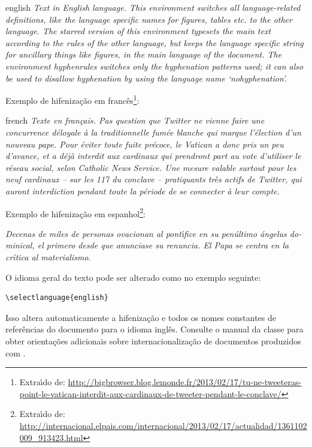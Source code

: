 \begin{otherlanguage*}{english}
	\textit{Text in English language. This environment switches all language-related
		definitions, like the language specific names for figures, tables etc. to the other
		language. The starred version of this environment typesets the main text
		according to the rules of the other language, but keeps the language specific
		string for ancillary things like figures, in the main language of the document.
		The environment hyphenrules switches only the hyphenation patterns used; it can
		also be used to disallow hyphenation by using the language name
		`nohyphenation'.}
\end{otherlanguage*}

Exemplo de hifeniza\c{c}\~ao em franc\^es\footnote{Extra\'{\i}do de:
	\url{http://bigbrowser.blog.lemonde.fr/2013/02/17/tu-ne-tweeteras-point-le-vatican-interdit-aux-cardinaux-de-tweeter-pendant-le-conclave/}}:

\begin{otherlanguage*}{french}
	\textit{Texte en fran\c{c}ais. Pas question que Twitter ne vienne faire une
		concurrence d\'eloyale \`a la traditionnelle fum\'ee blanche qui marque l'\'election
		d'un nouveau pape. Pour \'eviter toute fuite pr\'ecoce, le Vatican a donc pris un
		peu d'avance, et a d\'ej\`a interdit aux cardinaux qui prendront part au vote
		d'utiliser le r\'eseau social, selon Catholic News Service. Une mesure valable
		surtout pour les neuf cardinaux – sur les 117 du conclave – pratiquants très
		actifs de Twitter, qui auront interdiction pendant toute la p\'eriode de se
		connecter \`a leur compte.}
\end{otherlanguage*}

Exemplo de hifeniza\c{c}\~ao em espanhol\footnote{Extra\'{\i}do de:
	\url{http://internacional.elpais.com/internacional/2013/02/17/actualidad/1361102009_913423.html}}:

\foreignlanguage{spanish}{\textit{Decenas de miles de personas ovacionan al pont\'{\i}fice en su
		pen\'ultimo \'angelus dominical, el primero desde que anunciase su renuncia. El Papa se
		centra en la cr\'{\i}tica al materialismo}}.

O idioma geral do texto pode ser alterado como no exemplo seguinte:

\begin{verbatim}
\selectlanguage{english}

\end{verbatim}

Isso altera automaticamente a hifeniza\c{c}\~ao e todos os nomes constantes de
refer\^encias do documento para o idioma ingl\^es. Consulte o manual da classe para obter orienta\c{c}\~oes adicionais sobre internacionaliza\c{c}\~ao de documentos produzidos com \textsf{\abnTeX} \cite{abnetxclasse}.

